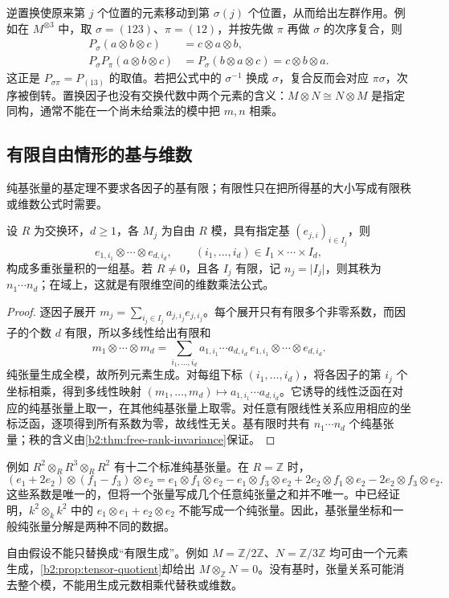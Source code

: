 逆置换使原来第 \(j\) 个位置的元素移动到第 \(\sigma(j)\) 个位置，从而给出左群作用。例如在 \(M^{\otimes3}\) 中，取 \(\sigma=(123)\)、\(\pi=(12)\)，并按先做 \(\pi\) 再做 \(\sigma\) 的次序复合，则
\[
	\begin{aligned}
		P_\sigma(a\otimes b\otimes c)&=c\otimes a\otimes b,\\
		P_\sigma P_\pi(a\otimes b\otimes c) &=P_\sigma(b\otimes a\otimes c) =c\otimes b\otimes a.
	\end{aligned}
\]
这正是 \(P_{\sigma\pi}=P_{(13)}\) 的取值。若把公式中的 \(\sigma^{-1}\) 换成 \(\sigma\)，复合反而会对应 \(\pi\sigma\)，次序被倒转。置换因子也没有交换代数中两个元素的含义：\(M\otimes N\cong N\otimes M\) 是指定同构，通常不能在一个尚未给乘法的模中把 \(m,n\) 相乘。

\subsection{有限自由情形的基与维数}
\label{b2:subsec:0801:03}

纯基张量的基定理不要求各因子的基有限；有限性只在把所得基的大小写成有限秩或维数公式时需要。

\begin{proposition}\label{b2:prop:multiple-tensor-basis}
	设 \(R\) 为交换环，\(d\ge1\)，各 \(M_j\) 为自由 \(R\) 模，具有指定基 \((e_{j,i})_{i\in I_j}\)，则
	\[
		e_{1,i_1}\otimes\cdots\otimes e_{d,i_d}, \qquad (i_1,\ldots,i_d)\in I_1\times\cdots\times I_d,
	\]
	构成多重张量积的一组基。若 \(R\ne0\)，且各 \(I_j\) 有限，记 \(n_j=\lvert I_j\rvert\)，则其秩为 \(n_1\cdots n_d\)；在域上，这就是有限维空间的维数乘法公式。
\end{proposition}
\begin{proof}
	逐因子展开 \(m_j=\sum_{i_j\in I_j}a_{j,i_j}e_{j,i_j}\)。每个展开只有有限多个非零系数，而因子的个数 \(d\) 有限，所以多线性给出有限和
	\[
		m_1\otimes\cdots\otimes m_d =\sum_{i_1,\ldots,i_d} a_{1,i_1}\cdots a_{d,i_d}\, e_{1,i_1}\otimes\cdots\otimes e_{d,i_d}.
	\]
	纯张量生成全模，故所列元素生成。对每组下标 \((i_1,\ldots,i_d)\)，将各因子的第 \(i_j\) 个坐标相乘，得到多线性映射 \((m_1,\ldots,m_d)\mapsto a_{1,i_1}\cdots a_{d,i_d}\)。它诱导的线性泛函在对应的纯基张量上取一，在其他纯基张量上取零。对任意有限线性关系应用相应的坐标泛函，逐项得到所有系数为零，故线性无关。基有限时共有 \(n_1\cdots n_d\) 个纯基张量；秩的含义由\cref{b2:thm:free-rank-invariance}保证。
\end{proof}

例如 \(R^2\otimes_RR^3\otimes_RR^2\) 有十二个标准纯基张量。在 \(R=\mathbb Z\) 时，
\[
	(e_1+2e_2)\otimes(f_1-f_3)\otimes e_2 =e_1\otimes f_1\otimes e_2-e_1\otimes f_3\otimes e_2 +2e_2\otimes f_1\otimes e_2-2e_2\otimes f_3\otimes e_2.
\]
这些系数是唯一的，但将一个张量写成几个任意纯张量之和并不唯一。中已经证明，\(k^2\otimes_k k^2\) 中的 \(e_1\otimes e_1+e_2\otimes e_2\) 不能写成一个纯张量。因此，基张量坐标和一般纯张量分解是两种不同的数据。

\ProseParagraphBreak
自由假设不能只替换成“有限生成”。例如 \(M=\mathbb Z/2\mathbb Z\)、\(N=\mathbb Z/3\mathbb Z\) 均可由一个元素生成，\cref{b2:prop:tensor-quotient}却给出 \(M\otimes_{\mathbb Z}N=0\)。没有基时，张量关系可能消去整个模，不能用生成元数相乘代替秩或维数。
